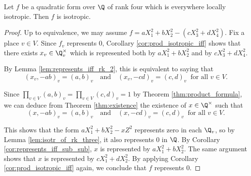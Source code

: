 \begin{lemma}\label{lem:isotr_of_rk_four}
\leanok
Let $f$ be a quadratic form over $\Q$ of rank four which is everywhere locally isotropic. Then $f$ is isotropic.
\end{lemma}
\begin{proof}
Up to equivalence, we may assume $f = aX_1^2 + bX_2^2 - (cX_3^2 + dX_4^2)$. Fix a place $v \in V$. Since $f_v$ represents $0$, Corollary \ref{cor:prod_isotropic_iff} shows that there exists $x_v \in \Q_v^\times$ which is represented both by $aX_1^2 + bX_2^2$ and by  $cX_3^2 + dX_4^2$.

By Lemma \ref{lem:represents_iff_rk_2}, this is equivalent to saying that 
\[ (x_v, -ab)_v = (a, b)_v \quad \text{and} \quad (x_v, -cd)_v = (c, d)_v \: \text{ for all } v \in V. \]

Since $\displaystyle \prod_{v \in V} (a, b)_v = \prod_{v \in V} (c, d)_v = 1$ by Theorem \ref{thm:product_formula}, we can deduce from Theorem \ref{thm:existence} the existence of $x \in \Q^\times$ such that 
\[ (x, -ab)_v = (a, b)_v \quad \text{and} \quad (x, -cd)_v = (c, d)_v \: \text{ for all } v \in V. \]

This shows that the form $aX_1^2 + bX_2^2 - xZ^2$ represents zero in each $\Q_v$, so by Lemma \ref{lem:isotr_of_rk_three}, it also represents $0$ in $\Q$. By Corollary \ref{cor:represents_iff_sub_sub}, $x$ is represented by $aX_1^2 + bX_2^2$. The same argument shows that $x$ is represented by $cX_1^2 + dX_2^2$. By applying Corollary \ref{cor:prod_isotropic_iff} again, we conclude that $f$ represents $0$.
\end{proof}

